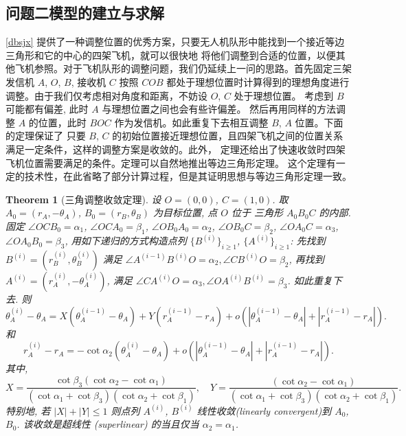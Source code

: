 \documentclass{my_paper}
\newtheorem{theorem}{Theorem}
\begin{document}
\subsection{问题二模型的建立与求解}

\ref{dbsjx} 提供了一种调整位置的优秀方案，只要无人机队形中能找到一个接近等边三角形和它的中心的四架飞机，就可以很快地
将他们调整到合适的位置，以便其他飞机参照。对于飞机队形的调整问题，我们仍延续上一问的思路。首先固定三架发信机 $A$, $O$, $B$, 接收机 $C$ 按照 $COB$ 
都处于理想位置时计算得到的理想角度进行调整。由于我们仅考虑相对角度和距离，不妨设 $O$, $C$ 处于理想位置。
考虑到 $B$ 可能都有偏差, 此时 $A$ 与理想位置之间也会有些许偏差。
然后再用同样的方法调整 $A$ 的位置，此时 $BOC$ 作为发信机。如此重复下去相互调整 $B$, $A$ 位置。下面的定理保证了
只要 $B$, $C$ 的初始位置接近理想位置，且四架飞机之间的位置关系满足一定条件，这样的调整方案是收敛的。此外，
定理还给出了快速收敛时四架飞机位置需要满足的条件。定理可以自然地推出等边三角形定理。
这个定理有一定的技术性，在此省略了部分计算过程，但是其证明思想与等边三角形定理一致。 
\begin{theorem}[三角调整收敛定理]
    设 $O=(0,0)$, $C=(1,0)$. 取 $A_0=(r_A, -\theta_A)$, $B_0 = (r_B,\theta_B)$ 为目标位置, 点 $O$ 位于
    三角形 $A_0B_0C$ 的内部.
    固定 $\angle OCB_0=\alpha_1$, $\angle OCA_0=\beta_1$, $\angle OB_0A_0=\alpha_2$, $\angle OB_0C=\beta_2$,
    $\angle OA_0C=\alpha_3$, $\angle OA_0B_0=\beta_3$,  
    用如下递归的方式构造点列 $\{B^{(i)}\}_{i\geq 1}$, $\{A^{(i)}\}_{i\geq 1}$: 先找到
    $B^{(i)}=(r_B^{(i)},\theta_B^{(i)})$ 满足 $\angle A^{(i-1)}B^{(i)}O=\alpha_2, \angle CB^{(i)}O=\beta_2$, 再找到
    $A^{(i)}=(r_A^{(i)},-\theta_A^{(i)})$, 满足 $\angle CA^{(i)}O=\alpha_3, \angle OA^{(i)}B^{(i)}=\beta_3$. 如此重复下去.
    则 
    $$
        \theta_A^{(i)}-\theta_A = X(\theta_A^{(i-1)}-\theta_A) + Y(r_A^{(i-1)}-r_A) + o(|\theta_A^{(i-1)}-\theta_A|+|r_A^{(i-1)}-r_A|).
    $$
    和
    $$
        r_A^{(i)}-r_A = -\cot\alpha_2 (\theta_A^{(i)}-\theta_A )+o(|\theta_A^{(i-1)}-\theta_A|+|r_A^{(i-1)}-r_A|).
    $$
    其中, 
    $$
    X=\frac{\cot \beta_3(\cot \alpha_2-\cot \alpha_1)}
    {(\cot \alpha_1+\cot \beta_3)(\cot \alpha_2+\cot \beta_1)},\quad
    Y=\frac{(\cot \alpha_2-\cot \alpha_1)}
    {(\cot \alpha_1+\cot \beta_3)(\cot \alpha_2+\cot \beta_1)}.
    $$
    特别地, 若 $|X|+|Y|\leq 1$ 则点列 $A^{(i)}$, $B^{(i)}$ 线性收敛(linearly convergent)到 $A_0$, $B_0$. 
    该收敛是超线性 (superlinear) 的当且仅当 $\alpha_2=\alpha_1$.  
\end{theorem}
\end{document}
